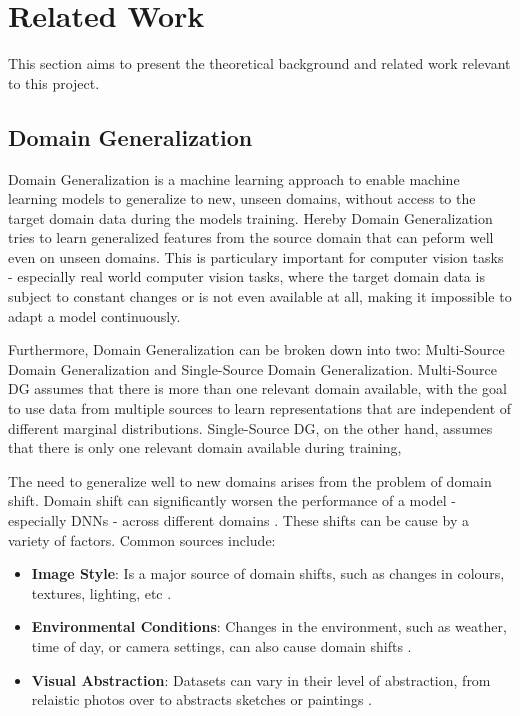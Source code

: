 \section{Related Work}
This section aims to present the theoretical background and related work relevant to this project.

\subsection{Domain Generalization}

Domain Generalization is a machine learning approach to enable machine learning models to generalize to new, unseen domains, without  access to the target domain data during the models training. Hereby Domain Generalization tries to learn generalized features from the source domain that can peform well even on unseen domains. This is particulary important for computer vision tasks - especially real world computer vision tasks, where the target domain data is subject to constant changes or is not even available at all, making it impossible to adapt a model continuously. \cite{liDeeperBroaderArtier2017,liuDEJAVUContinual2023,blanchardGeneralizingSeveralRelated2011}


Furthermore, Domain Generalization can be broken down into two: Multi-Source Domain Generalization and Single-Source Domain Generalization.
Multi-Source DG assumes that there is more than one relevant domain available, with the goal to use data from multiple sources to learn representations that are independent of different marginal distributions. \cite{blanchardGeneralizingSeveralRelated2011}
Single-Source DG, on the other hand, assumes that there is only one relevant domain available during training, 

The need to generalize well to new domains arises from the problem of domain shift. Domain shift can significantly worsen the performance of a model - especially DNNs - across different domains \cite{muandetDomainGeneralizationInvariant2013}. These shifts can be cause by a variety of factors. Common sources include:
\begin{itemize}
    \item \textbf{Image Style}: Is a major source of domain shifts, such as changes in colours, textures, lighting, etc \cite{zhouMixStyleNeuralNetworks2023}.
    \item \textbf{Environmental Conditions}: Changes in the environment, such as weather, time of day, or camera settings, can also cause domain shifts \cite{schwonbergAugmentationbasedDomainGeneralization2023}.
    \item \textbf{Visual Abstraction}: Datasets can vary in their level of abstraction, from relaistic photos over to abstracts sketches or paintings \cite{liDeeperBroaderArtier2017}.
\end{itemize}




